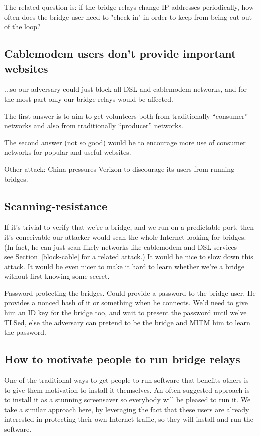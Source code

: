 \documentclass{llncs}
\begin{document}
The related question is: if the bridge relays change IP addresses
periodically, how often does the bridge user need to "check in" in order
to keep from being cut out of the loop?

\subsection{Cablemodem users don't provide important websites}
\label{subsec:block-cable}

...so our adversary could just block all DSL and cablemodem networks,
and for the most part only our bridge relays would be affected.

The first answer is to aim to get volunteers both from traditionally
``consumer'' networks and also from traditionally ``producer'' networks.

The second answer (not so good) would be to encourage more use of consumer
networks for popular and useful websites.

Other attack: China pressures Verizon to discourage its users from
running bridges.

\subsection{Scanning-resistance}

If it's trivial to verify that we're a bridge, and we run on a predictable
port, then it's conceivable our attacker would scan the whole Internet
looking for bridges. (In fact, he can just scan likely networks like
cablemodem and DSL services --- see Section~\ref{block-cable} for a related
attack.) It would be nice to slow down this attack. It would
be even nicer to make it hard to learn whether we're a bridge without
first knowing some secret.

Password protecting the bridges.
Could provide a password to the bridge user. He provides a nonced hash of
it or something when he connects. We'd need to give him an ID key for the
bridge too, and wait to present the password until we've TLSed, else the
adversary can pretend to be the bridge and MITM him to learn the password.

\subsection{How to motivate people to run bridge relays}

One of the traditional ways to get people to run software that benefits
others is to give them motivation to install it themselves.  An often
suggested approach is to install it as a stunning screensaver so everybody
will be pleased to run it. We take a similar approach here, by leveraging
the fact that these users are already interested in protecting their
own Internet traffic, so they will install and run the software.
\end{document}
